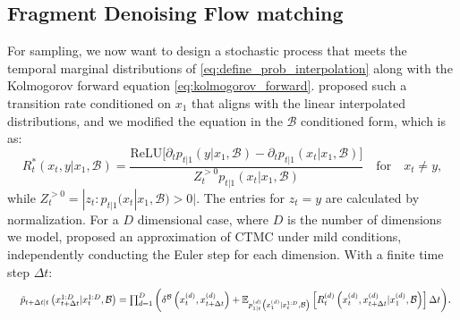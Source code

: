 \subsection{Fragment Denoising Flow matching}

For sampling, we now want to design a stochastic process that meets the temporal marginal distributions of \cref{eq:define_prob_interpolation} along with the Kolmogorov forward equation \cref{eq:kolmogorov_forward}.
\citet{dfm_1} proposed such a transition rate conditioned on $x_1$ that aligns with the linear interpolated distributions, and we modified the equation in the $\mathcal{B}$ conditioned form, which is as:
\begin{equation}
    R^{*}_t(x_t, y | x_1, \mathcal{B}) =
    \frac{
    \text{ReLU} \Big[ \partial_t p_{t|1}(y | x_1, \mathcal{B}) 
    - \partial_t p_{t|1}(x_t | x_1, \mathcal{B}) \Big]
    }{
    Z_t^{>0} p_{t|1}(x_t | x_1, \mathcal{B})
    } \quad \text{for} \quad x_t \neq y, 
\end{equation}
while $Z_t^{>0}=|z_t:p_{t|1}(x_t|x_1,\mathcal{B})> 0|$. The entries for $z_t=y$ are calculated by normalization. 
For a $D$ dimensional case, where $D$ is the number of dimensions we model, \citet{dfm_1} proposed an approximation of CTMC under mild conditions, independently conducting the Euler step for each dimension. With a finite time step $\Delta t$: 
\begin{equation}\
    \resizebox{\linewidth}{!}{
    $
    \tilde{p}_{t+\Delta t|t} \left( x_{t+\Delta t}^{1:D} | x_t^{1:D}, \mathcal{B} \right) 
     = \prod_{d=1}^{D} 
     \left( \delta^{\mathcal{B}} \left( x_t^{(d)}, x_{t+\Delta t}^{(d)} \right) 
     + \mathbb{E}_{p_{1|t}^{(d)} 
     \left( x_1^{(d)} | x_t^{1:D}, \mathcal{B}\right)} \left [ R_t^{(d)} \left( x_t^{(d)}, x_{t+\Delta t}^{(d)} | x_1^{(d)}, \mathcal{B}\right) \right] \Delta t \right)
     $}.
     \label{eq:euler_step_ctmc}
\end{equation}

